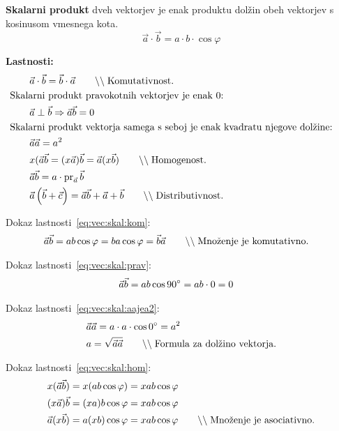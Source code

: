 \documentclass[a4paper,oneside,12pt,fleqn]{article}
\newcommand\krat\cdot
\newcommand{\comment}[1]{\ensuremath{\qquad\backslash\backslash\;}\textnormal{#1}}
\newcommand{\pr}{\ensuremath{\operatorname{pr}}} %
\def\kos{\cos}
\def\deg{\degree}
\renewcommand\implies\Rightarrow
\numberwithin{equation}{section}
\begin{document}
\textbf{Skalarni produkt} dveh vektorjev je enak produktu dolžin obeh vektorjev s
kosinusom vmesnega kota.
\begin{equation}
  \vec{a} \krat \vec{b} = a \krat b \krat \kos\varphi \label{eq:vec:skal:def}
\end{equation}


\textbf{Lastnosti:}
\begin{align}
  &\vec{a} \krat \vec{b} = \vec{b} \krat \vec{a} \comment{Komutativnost.}  \label{eq:vec:skal:kom} \\
  &\hspace{-20pt} \text{Skalarni produkt pravokotnih vektorjev je enak 0:} \nonumber \\
  &\vec{a} \perp \vec{b} \implies \vec{a}\vec{b} = 0 \label{eq:vec:skal:prav} \\
  &\hspace{-20pt} \text{Skalarni produkt vektorja samega s seboj je enak kvadratu njegove dolžine:} \nonumber \\
  &\vec{a}\vec{a} = a^2  \label{eq:vec:skal:aajea2} \\
  &x(\vec{a}\vec{b} = (x\vec{a})\vec{b} = \vec{a}(x\vec{b}) \comment{Homogenost.}
  \label{eq:vec:skal:hom} \\
  &\vec{a}\vec{b} =  a \krat \pr_{\vec{a}}\vec{b} \label{eq:vec:skal:proj} \\
  &\vec{a}\left( \vec{b} + \vec{c} \right) =  \vec{a}\vec{b} + \vec{a} + \vec{b}
  \comment{Distributivnost.} \label{eq:vec:skal:dist}
\end{align}

Dokaz lastnosti~\ref{eq:vec:skal:kom}:
\begin{align*}
  & \vec{a}\vec{b} = ab\kos\varphi = ba\kos\varphi = \vec{b}\vec{a} \comment{Množenje je
  komutativno.}
\end{align*}

Dokaz lastnosti~\ref{eq:vec:skal:prav}:
\begin{align*}
  &\vec{a}\vec{b} = ab\kos90\deg = ab\krat0 = 0
\end{align*}

Dokaz lastnosti~\ref{eq:vec:skal:aajea2}:
\begin{align*}
  &\vec{a}\vec{a} = a\krat a \krat\kos0\deg = a^2 \\
  &a = \sqrt{\vec{a}\vec{a}} \comment{Formula za dolžino vektorja.}
\end{align*}

Dokaz lastnosti~\ref{eq:vec:skal:hom}:
\begin{align*}
  x(\vec{a}\vec{b}) &=  x(ab\kos\varphi) = xab\kos\varphi \\
  (x\vec{a})\vec{b} &= (xa)b\kos\varphi = xab\kos\varphi \\
  \vec{a}(x\vec{b}) &= a(xb)\kos\varphi = xab\kos\varphi \comment{Množenje je
  asociativno.}
\end{align*}
\end{document}
